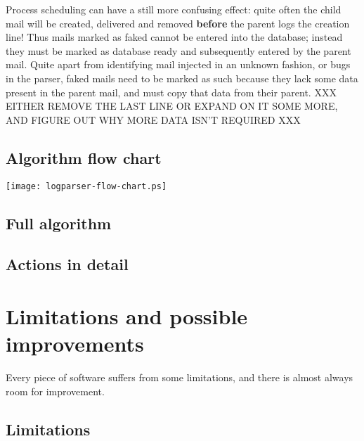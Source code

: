 \documentclass[a4paper,12pt,draft]{article}
\begin{document}
\begin{enumerate}
        Process scheduling can have a still more confusing effect: quite
        often the child mail will be created, delivered and removed
        \textbf{before} the parent logs the creation line!  Thus mails
        marked as faked cannot be entered into the database; instead they
        must be marked as database ready and subsequently entered by the
        parent mail.  Quite apart from identifying mail injected in an
        unknown fashion, or bugs in the parser, faked mails need to be
        marked as such because they lack some data present in the parent
        mail, and must copy that data from their parent.  XXX EITHER REMOVE
        THE LAST LINE OR EXPAND ON IT SOME MORE, AND FIGURE OUT WHY MORE
        DATA ISN'T REQUIRED XXX


\end{enumerate}

\subsection{Algorithm flow chart}

\texttt{[image: logparser-flow-chart.ps]}
\label{flow-chart}

\subsection{Full algorithm}

\label{full-algorithm}


\subsection{Actions in detail}

\label{actions-in-detail}


\section{Limitations and possible improvements}

Every piece of software suffers from some limitations, and there is almost
always room for improvement.

\subsection{Limitations}
\end{document}
